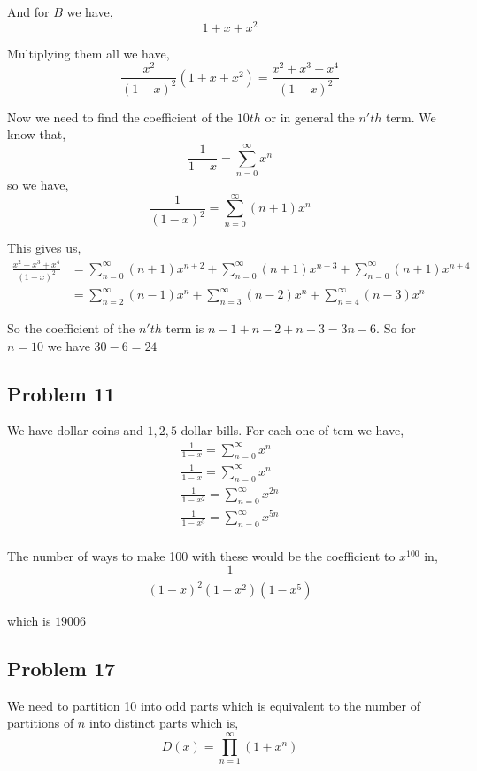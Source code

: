 \documentclass[a4paper]{report}
\begin{document}
And for $B$ we have,  
$$ 1 + x + x^2 $$ 

Multiplying them all we have, 
$$ \frac{x^2}{(1 - x)^2}  (1 + x + x^2) = \frac{x^2 + x^{3} + x^{4}}{(1 - x)^2}$$ 

Now we need to find the coefficient of the $10th$ or in general the $n'th$ term. We know that, 
$$ \frac{1}{1 - x} = \sum_{n=0}^{\infty} x^{n} $$  so we have, 
$$ \frac{1}{(1 - x)^2} = \sum_{n=0}^{\infty} (n + 1)x^{n} $$ 

This gives us, 
\begin{align*}
    \frac{x^2 + x^{3} + x^{4}}{(1 - x)^2} &= \sum_{n=0}^{\infty} (n + 1)x^{n + 2} + \sum_{n=0}^{\infty} (n + 1)x^{n + 3} + \sum_{n=0}^{\infty} (n + 1)x^{n + 4} \\
                                          &= \sum_{n=2}^{\infty} (n - 1)x^{n} + \sum_{n=3}^{\infty} (n - 2) x^{n} + \sum_{n=4}^{\infty} (n - 3)x^{n}
\end{align*}

So the coefficient of the $n'th$ term is  $n - 1 + n - 2+ n - 3 = 3n - 6$. So for  $n = 10$ we have $30 - 6= 24$

\subsection*{Problem 11}
We have dollar coins and $1,2,5$ dollar bills. For each one of tem we have, 
\begin{align*}
    \frac{1}{1 - x} = \sum_{n=0}^{\infty} x^{n}\\
    \frac{1}{1 - x} = \sum_{n=0}^{\infty} x^{n}\\
    \frac{1}{1 - x^2} = \sum_{n=0}^{\infty} x^{2n}\\
    \frac{1}{1 - x^{5}} = \sum_{n=0}^{\infty} x^{5n}\\
\end{align*}

The number of ways to make 100 with these would be the coefficient to $x^{100}$ in,
$$ \frac{1}{(1 - x)^2(1 - x^2)(1 - x^{5})} $$ 

which is $19006$


\subsection*{Problem 17}

We need to partition 10 into odd parts which is equivalent to the number of partitions of $n$ into distinct parts which is, 
$$ D(x) = \prod_{n = 1}^{\infty} (1 + x^{n}) $$ 
\end{document}
